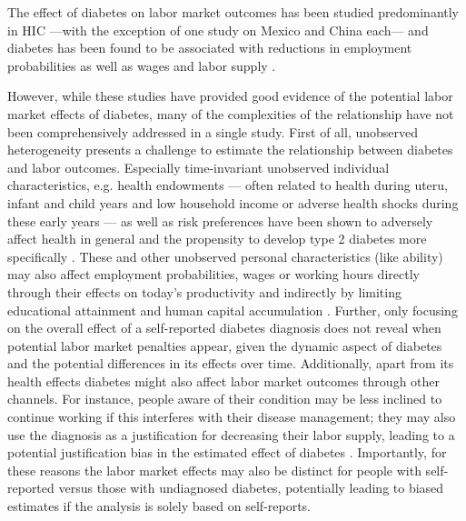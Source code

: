 \documentclass[12pt,english]{article}
\begin{document}
The effect of diabetes on labor market outcomes has been studied predominantly in \ac{HIC} ---with the exception of one study on Mexico \autocite{Seuring2015} and China \parencite{Liu2014} each--- and diabetes has been found to be associated with reductions in employment probabilities as well as wages and labor supply \parencite{Brown2005,Brown2014,BrownIII2011,Minor2010,Minor2013,Minor2015,Latif2009,Seuring2015a}.

However, while these studies have provided good evidence of the potential labor market effects of diabetes, many of the complexities of the relationship have not been comprehensively addressed in a single study. First of all, unobserved heterogeneity presents a challenge to estimate the relationship between diabetes and labor outcomes. Especially time-invariant unobserved individual characteristics, e.g. health endowments --- often related to health during uteru, infant and child years and low household income or adverse health shocks during these early years --- as well as risk preferences have been shown to adversely affect health in general and the propensity to develop type 2 diabetes more specifically \parencite{VanEwijk2011,Sotomayor2013,Li2010b}. These and other unobserved personal characteristics (like ability) may also affect employment probabilities, wages or working hours directly through their effects on today's productivity \parencite{Currie2013} and indirectly by limiting educational attainment and human capital accumulation \parencite{Ayyagari2011a}. Further, only focusing on the overall effect of a self-reported diabetes diagnosis does not reveal when potential labor market penalties appear, given the dynamic aspect of diabetes and the potential differences in its effects over time. Additionally, apart from its health effects diabetes might also affect labor market outcomes through other channels. For instance, people aware of their condition may be less inclined to continue working if this interferes with their disease management; they may also use the diagnosis as a justification for decreasing their labor supply, leading to a potential justification bias in the estimated effect of diabetes \parencite{Kapteyn2009}. Importantly, for these reasons the labor market effects may also be distinct for people with self-reported versus those with undiagnosed diabetes, potentially leading to biased estimates if the analysis is solely based on self-reports.
\end{document}
